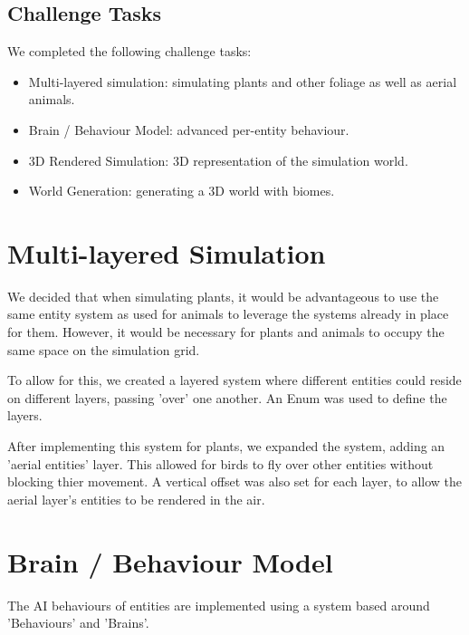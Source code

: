 \documentclass{article}
\begin{document}
\begin{multicols}{2}
        \subsection{Challenge Tasks}

            We completed the following challenge tasks:

            \begin{itemize}
                \setlength\itemsep{0.01em}
                \item Multi-layered simulation: simulating plants and other foliage as well as aerial animals.
                \item Brain / Behaviour Model: advanced per-entity behaviour.
                \item 3D Rendered Simulation: 3D representation of the simulation world.
                \item World Generation: generating a 3D world with biomes.
            \end{itemize}

        \section{Multi-layered Simulation}
        We decided that when simulating plants, it would be advantageous to use the same entity system as used for animals to leverage the systems already in place for them. However, it would be necessary for plants and animals to occupy the same space on the simulation grid. 
        
        To allow for this, we created a layered system where different entities could reside on different layers, passing 'over' one another. An Enum was used to define the layers.
        
        After implementing this system for plants, we expanded the system, adding an 'aerial entities' layer. This allowed for birds to fly over other entities without blocking thier movement. A vertical offset was also set for each layer, to allow the aerial layer's entities to be rendered in the air.

        \section{Brain / Behaviour Model}

        The AI behaviours of entities are implemented using a system based around 'Behaviours' and 'Brains'.
        

\end{multicols}
\end{document}
